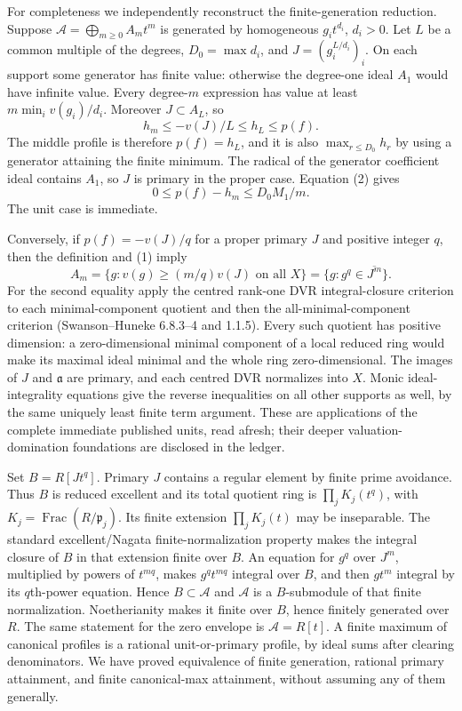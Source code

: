 For completeness we independently reconstruct the finite-generation reduction. Suppose $\mathcal A=\bigoplus_{m\ge0}A_mt^m$ is generated by homogeneous $g_it^{d_i}$, $d_i>0$. Let $L$ be a common multiple of the degrees, $D_0=\max d_i$, and $J=(g_i^{L/d_i})_i$. On each support some generator has finite value: otherwise the degree-one ideal $A_1$ would have infinite value. Every degree-$m$ expression has value at least $m\min_i v(g_i)/d_i$. Moreover $J\subset A_L$, so
\[
 h_m\le -v(J)/L\le h_L\le p(f).
\]
The middle profile is therefore $p(f)=h_L$, and it is also $\max_{r\le D_0}h_r$ by using a generator attaining the finite minimum. The radical of the generator coefficient ideal contains $A_1$, so $J$ is primary in the proper case. Equation (2) gives
\[
 0\le p(f)-h_m\le D_0M_1/m. \tag{5}
\]
The unit case is immediate.

Conversely, if $p(f)=-v(J)/q$ for a proper primary $J$ and positive integer $q$, then the definition and (1) imply
\[
 A_m=\{g:v(g)\ge (m/q)v(J)\text{ on all }X\}
     =\{g:g^q\in\overline{J^m}\}. \tag{6}
\]
For the second equality apply the centred rank-one DVR integral-closure criterion to each minimal-component quotient and then the all-minimal-component criterion (Swanson--Huneke 6.8.3--4 and 1.1.5). Every such quotient has positive dimension: a zero-dimensional minimal component of a local reduced ring would make its maximal ideal minimal and the whole ring zero-dimensional. The images of $J$ and $\mathfrak a$ are primary, and each centred DVR normalizes into $X$. Monic ideal-integrality equations give the reverse inequalities on all other supports as well, by the same uniquely least finite term argument. These are applications of the complete immediate published units, read afresh; their deeper valuation-domination foundations are disclosed in the ledger.

Set $B=R[Jt^q]$. Primary $J$ contains a regular element by finite prime avoidance. Thus $B$ is reduced excellent and its total quotient ring is $\prod_j K_j(t^q)$, with $K_j=\operatorname{Frac}(R/\mathfrak p_j)$. Its finite extension $\prod_j K_j(t)$ may be inseparable. The standard excellent/Nagata finite-normalization property makes the integral closure of $B$ in that extension finite over $B$. An equation for $g^q$ over $J^m$, multiplied by powers of $t^{mq}$, makes $g^qt^{mq}$ integral over $B$, and then $gt^m$ integral by its $q$th-power equation. Hence $B\subset\mathcal A$ and $\mathcal A$ is a $B$-submodule of that finite normalization. Noetherianity makes it finite over $B$, hence finitely generated over $R$. The same statement for the zero envelope is $\mathcal A=R[t]$. A finite maximum of canonical profiles is a rational unit-or-primary profile, by ideal sums after clearing denominators. We have proved equivalence of finite generation, rational primary attainment, and finite canonical-max attainment, without assuming any of them generally.

